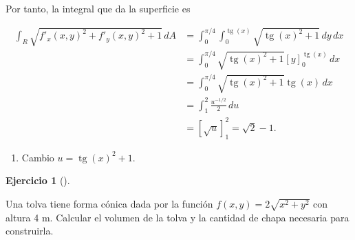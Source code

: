 \documentclass[
  spanish,
  a4paper,
]{scrreport}
\providecommand{\tightlist}{%
  \setlength{\itemsep}{0pt}\setlength{\parskip}{0pt}}
\theoremstyle{definition}
\newtheorem{exercise}{Ejercicio}[chapter]
\theoremstyle{remark}
\begin{document}
\begin{tcolorbox}
\begin{enumerate}
  Por tanto, la integral que da la superficie es

  \begin{align*}
  \int_R \sqrt{f'_x(x,y)^2+f'_y(x,y)^2+1}\,dA
  &= \int_{0}^{\pi/4} \int_{0}^{\operatorname{tg}(x)} \sqrt{\operatorname{tg}(x)^2+1}\,dy\,dx \\
  &= \int_{0}^{\pi/4} \sqrt{\operatorname{tg}(x)^2+1}[y]_0^{\operatorname{tg}(x)}\,dx \\
  &= \int_{0}^{\pi/4} \sqrt{\operatorname{tg}(x)^2+1}\operatorname{tg}(x)\,dx \\
  &= \int_1^2 \frac{u^{-1/2}}{2}\,du \tag{1}\\
  &= [\sqrt{u}]_1^2 
  = \sqrt{2}-1.
  \end{align*}

  \begin{enumerate}
  \def\labelenumii{(\arabic{enumii})}
  \tightlist
  \item
    Cambio \(u=\operatorname{tg}(x)^2+1\).
  \end{enumerate}
\end{enumerate}

\end{tcolorbox}

\begin{exercise}[]\protect\hypertarget{exr-area-superficie-tolva}{}\label{exr-area-superficie-tolva}

Una tolva tiene forma cónica dada por la función
\(f(x,y)=2\sqrt{x^2+y^2}\) con altura 4 m. Calcular el volumen de la
tolva y la cantidad de chapa necesaria para construirla.

\end{exercise}
\end{document}
